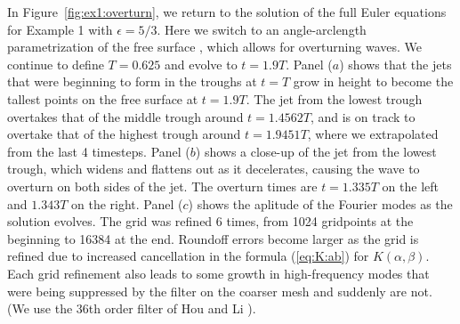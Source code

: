 \documentclass[11pt]{article}
\theoremstyle{plain}
\theoremstyle{definition}
\theoremstyle{definition}
\newcommand{\eps}{\epsilon}
\begin{document}

In Figure~\ref{fig:ex1:overturn}, we return to the solution of the
full Euler equations for Example 1 with $\eps=5/3$. Here we switch to
an angle-arclength parametrization of the free surface
\cite{hls:94,hls:97,hls:01,ambrose-wilkening:vortex-sheet-2014}, which
allows for overturning waves. We continue to define $T=0.625$ and
evolve to $t=1.9T$. Panel ($a$) shows that the jets that were
beginning to form in the troughs at $t=T$ grow in height to become the
tallest points on the free surface at $t=1.9T$. The jet from the
lowest trough overtakes that of the middle trough around $t=1.4562T$,
and is on track to overtake that of the highest trough around
$t=1.9451T$, where we extrapolated from the last 4 timesteps.  Panel
($b$) shows a close-up of the jet from the lowest trough, which widens
and flattens out as it decelerates, causing the wave to overturn on
both sides of the jet. The overturn times are $t=1.335T$ on the left
and $1.343T$ on the right. Panel ($c$) shows the aplitude of the
Fourier modes as the solution evolves. The grid was refined 6 times,
from 1024 gridpoints at the beginning to 16384 at the end. Roundoff
errors become larger as the grid is refined due to increased
cancellation in the formula (\ref{eq:K:ab}) for $K(\alpha,\beta)$.
Each grid refinement also leads to some growth in high-frequency modes
that were being suppressed by the filter on the coarser mesh and
suddenly are not.  (We use the 36th order filter of Hou and Li
  \cite{hou:li:07}).
\end{document}
